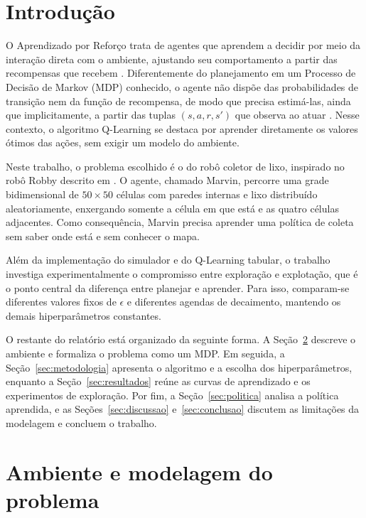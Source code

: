 
\section{Introdução}

O Aprendizado por Reforço trata de agentes que aprendem a decidir por meio da interação direta com o ambiente, ajustando seu comportamento a partir das recompensas que recebem \cite{sutton2018reinforcement}. Diferentemente do planejamento em um Processo de Decisão de Markov (MDP) conhecido, o agente não dispõe das probabilidades de transição nem da função de recompensa, de modo que precisa estimá-las, ainda que implicitamente, a partir das tuplas $(s, a, r, s')$ que observa ao atuar \cite{russell2016artificial}. Nesse contexto, o algoritmo Q-Learning se destaca por aprender diretamente os valores ótimos das ações, sem exigir um modelo do ambiente.

Neste trabalho, o problema escolhido é o do robô coletor de lixo, inspirado no robô Robby descrito em \cite{mitchell2009complexity}. O agente, chamado Marvin, percorre uma grade bidimensional de $50 \times 50$ células com paredes internas e lixo distribuído aleatoriamente, enxergando somente a célula em que está e as quatro células adjacentes. Como consequência, Marvin precisa aprender uma política de coleta sem saber onde está e sem conhecer o mapa.

Além da implementação do simulador e do Q-Learning tabular, o trabalho investiga experimentalmente o compromisso entre exploração e explotação, que é o ponto central da diferença entre planejar e aprender. Para isso, comparam-se diferentes valores fixos de $\epsilon$ e diferentes agendas de decaimento, mantendo os demais hiperparâmetros constantes.

O restante do relatório está organizado da seguinte forma. A Seção~\ref{sec:modelagem} descreve o ambiente e formaliza o problema como um MDP. Em seguida, a Seção~\ref{sec:metodologia} apresenta o algoritmo e a escolha dos hiperparâmetros, enquanto a Seção~\ref{sec:resultados} reúne as curvas de aprendizado e os experimentos de exploração. Por fim, a Seção~\ref{sec:politica} analisa a política aprendida, e as Seções~\ref{sec:discussao} e~\ref{sec:conclusao} discutem as limitações da modelagem e concluem o trabalho.

\section{Ambiente e modelagem do problema}
\label{sec:modelagem}

